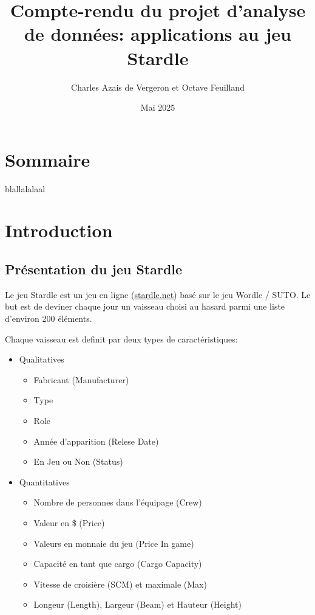 \documentclass{article}
\title{Compte-rendu du projet d'analyse de données: applications au jeu Stardle}
\author{Charles Azais de Vergeron et Octave Feuilland }
\date{Mai 2025}
\begin{document}
\maketitle
\section{Sommaire}
blallalalaal

\newpage
\maketitle
\section{Introduction}
\subsection{Présentation du jeu Stardle}

Le jeu Stardle est un jeu en ligne (\href{https://stardle.net}{stardle.net}) basé sur le jeu Wordle / SUTO. 
Le but est de deviner chaque jour un vaisseau choisi au hasard parmi une liste  d'environ 200 éléments. 

Chaque vaisseau est definit par deux types de caractéristiques: 
\begin{itemize}
    \item Qualitatives
    \begin{itemize}
        \item Fabricant (Manufacturer)
        \item Type
        \item Role 
        \item Année d'apparition (Relese Date)
        \item En Jeu ou Non (Status)
    \end{itemize}
    \item Quantitatives
    \begin{itemize}
        \item Nombre de personnes dans l'équipage (Crew)
        \item Valeur en \$ (Price)
        \item Valeurs en monnaie du jeu (Price In game)
        \item Capacité en tant que cargo (Cargo Capacity)
        \item Vitesse de croisière (SCM) et maximale (Max)
        \item Longeur (Length), Largeur (Beam) et Hauteur (Height)
    \end{itemize}
\end{itemize}
\end{document}
